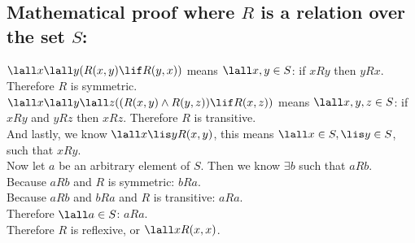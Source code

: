 \documentclass[10pt, letterpaper, titlepage]{article}
\begin{document}
        \subsection*{\comicneue\textbf{Mathematical proof where $R$ is a relation over the set $S$:}}
        {\comicneue
            $\lall x\lall y (R(x,y)\lif R(y,x))$ 
            means $\lall x, y \in S$: if $xRy$ then $yRx$. 
            Therefore $R$ is symmetric.\\
            $\lall x\lall y\lall z((R(x,y)\land R(y,z))\lif R(x,z))$
            means $\lall x, y, z \in S$: if $xRy$ and $yRz$ then $xRz$.
            Therefore $R$ is transitive.\\ 
            And lastly, we know $\lall x \lis y R(x,y)$,
            this means $\lall x \in S, \lis y \in S$, such that $xRy$.\\
            Now let $a$ be an arbitrary element of $S$. 
            Then we know $\exists b$ such that $aRb$.\\
            Because $aRb$ and $R$ is symmetric: $bRa$.\\
            Because $aRb$ and $bRa$ and $R$ is transitive: $aRa$.\\
            Therefore $\lall a \in S$: $aRa$. 
            \\Therefore $R$ is reflexive, or $\lall x R(x,x)$.
        }

\end{document}
